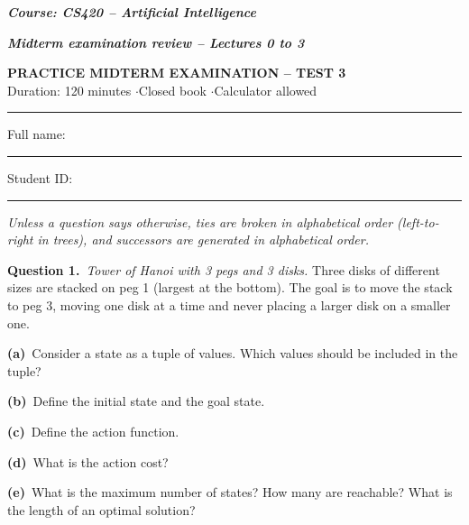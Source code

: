 \documentclass[11pt,a4paper]{article}
\newcommand{\question}[1]{\par\medskip\noindent\textbf{Question #1.}\ }
\newcommand{\subq}[1]{\par\smallskip\noindent\textbf{#1}\ }
\begin{document}
{\large\textbf{\textit{Course: CS420 -- Artificial Intelligence}}}\par
{\textbf{\textit{Midterm examination review -- Lectures 0 to 3}}}\par
\begin{center}{\Large\bfseries PRACTICE MIDTERM EXAMINATION -- TEST 3}\\[3pt]
{\small Duration: 120 minutes \quad$\cdot$\quad Closed book \quad$\cdot$\quad Calculator allowed}\end{center}
\noindent\rule{\linewidth}{0.6pt}

\noindent Full name: \rule{6.5cm}{0.3pt}\hfill Student ID: \rule{4cm}{0.3pt}\par\smallskip
{\small\textit{Unless a question says otherwise, ties are broken in alphabetical order (left-to-right in trees), and successors are generated in alphabetical order.}}\par
\question{1}\textit{Tower of Hanoi with 3 pegs and 3 disks.} Three disks of different sizes are stacked on peg 1 (largest at the bottom). The goal is to move the stack to peg 3, moving one disk at a time and never placing a larger disk on a smaller one.
\subq{(a)}Consider a state as a tuple of values. Which values should be included in the tuple?
\begin{ansbox}[height=1.0cm]\end{ansbox}
\subq{(b)}Define the initial state and the goal state.
\begin{ansbox}[height=0.8cm]\end{ansbox}
\subq{(c)}Define the action function.
\begin{ansbox}[height=1.5cm]\end{ansbox}
\subq{(d)}What is the action cost?
\begin{ansbox}[height=0.6cm]\end{ansbox}
\subq{(e)}What is the maximum number of states? How many are reachable? What is the length of an optimal solution?
\begin{ansbox}[height=1.2cm]\end{ansbox}
\end{document}

